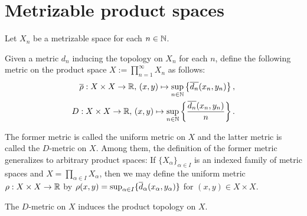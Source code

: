 \section{Metrizable product spaces}

Let $X_n$ be a metrizable space for each $n\in{\mathbb{N}}$.

\begin{nota}
    Given a metric $d_n$ inducing the topology on $X_n$ for each $n$,
    define the following metric on the product space $X:=\prod_{n=1}^\infty X_n$ as follows:
    \begin{align*}
        \overline{\rho}: X\times X\rightarrow{\mathbb{R}},\,(x, y)\mapsto\sup_{n\in{\mathbb{N}}}\left\{\overline{d_n}(x_n, y_n)\right\},\\
        D: X\times X\rightarrow{\mathbb{R}},\,(x, y)\mapsto\sup_{n\in{\mathbb{N}}}\left\{\frac{\overline{d_n}(x_n, y_n)}{n}\right\}.
    \end{align*}
\end{nota}

The former metric is called the uniform metric on $X$ and the latter metric is called the $D$-metric on $X$.
Among them, the definition of the former metric generalizes to arbitrary product spaces: If $\{X_\alpha\}_{\alpha\in I}$ is an indexed family of metric spaces and $X=\prod_{\alpha\in I} X_\alpha$, then we may define the uniform metric $\rho: X\times X\rightarrow {\mathbb{R}}$ by $\rho(x, y)=\sup_{\alpha\in I}\{\overline{d}_\alpha(x_\alpha, y_\alpha)\}$ for $(x, y)\in X\times X$.

\begin{thm}
    The $D$-metric on $X$ induces the product topology on $X$.
\end{thm}

